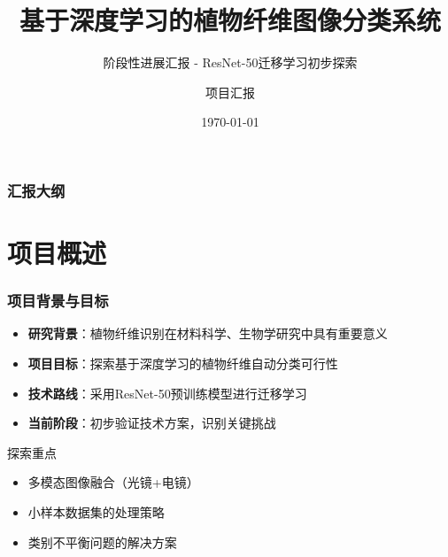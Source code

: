 \documentclass[12pt]{beamer}
\title{基于深度学习的植物纤维图像分类系统}
\subtitle{阶段性进展汇报 - ResNet-50迁移学习初步探索}
\author{项目汇报}
\institute{植物纤维识别项目组}
\date{\today}
\begin{document}
\frame{\titlepage}

\begin{frame}
\frametitle{汇报大纲}
\tableofcontents
\end{frame}

\section{项目概述}

\begin{frame}
\frametitle{项目背景与目标}
\begin{itemize}
    \item \textbf{研究背景}：植物纤维识别在材料科学、生物学研究中具有重要意义
    \item \textbf{项目目标}：探索基于深度学习的植物纤维自动分类可行性
    \item \textbf{技术路线}：采用ResNet-50预训练模型进行迁移学习
    \item \textbf{当前阶段}：初步验证技术方案，识别关键挑战
\end{itemize}

\vspace{0.3cm}
\begin{block}{探索重点}
\begin{itemize}
    \item 多模态图像融合（光镜+电镜）
    \item 小样本数据集的处理策略
    \item 类别不平衡问题的解决方案
\end{itemize}
\end{block}
\end{frame}
\end{document}
